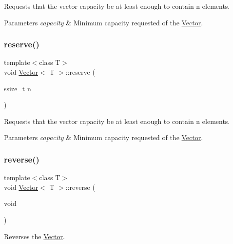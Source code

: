Requests that the vector capacity be at least enough to contain n elements. 
\begin{DoxyParams}{Parameters}
{\em capacity} & Minimum capacity requested of the \hyperlink{classVector}{Vector}. \\
\hline
\end{DoxyParams}
\mbox{\label{classVector_aebff8698d4672ac51e87d719a15a4a77}} 
\subsubsection{\texorpdfstring{reserve()}{reserve()}\hspace{0.1cm}{\footnotesize\ttfamily [2/2]}}
{\footnotesize\ttfamily template$<$class T$>$ \\
void \hyperlink{classVector}{Vector}$<$ T $>$\+::reserve (\begin{DoxyParamCaption}\item[{ssize\+\_\+t}]{n }\end{DoxyParamCaption})\hspace{0.3cm}{\ttfamily [inline]}}

Requests that the vector capacity be at least enough to contain n elements. 
\begin{DoxyParams}{Parameters}
{\em capacity} & Minimum capacity requested of the \hyperlink{classVector}{Vector}. \\
\hline
\end{DoxyParams}
\mbox{\label{classVector_ab5ab9d731026fcf0001c7252a55923ac}} 
\subsubsection{\texorpdfstring{reverse()}{reverse()}\hspace{0.1cm}{\footnotesize\ttfamily [1/2]}}
{\footnotesize\ttfamily template$<$class T$>$ \\
void \hyperlink{classVector}{Vector}$<$ T $>$\+::reverse (\begin{DoxyParamCaption}\item[{void}]{ }\end{DoxyParamCaption})\hspace{0.3cm}{\ttfamily [inline]}}

Reverses the \hyperlink{classVector}{Vector}. \mbox{\label{classVector_ab5ab9d731026fcf0001c7252a55923ac}} 
